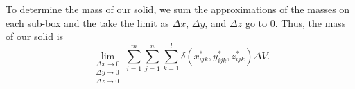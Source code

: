 \begin{activitySolution}
    \item To determine the mass of our solid, we sum the approximations of the masses on each sub-box and the take the limit as $\Delta x$, $\Delta y$, and $\Delta z$ go to 0. Thus, the mass of our solid is
\[\lim_{\substack{\Delta x \to 0 \\ \Delta y \to 0 \\ \Delta z \to 0}} \sum_{i=1}^m \sum_{j=1}^n \sum_{k=1}^l \delta(x_{ijk}^*, y_{ijk}^*, z_{ijk}^*) \Delta V.\]


\ea


\end{activitySolution}

\afterpa 